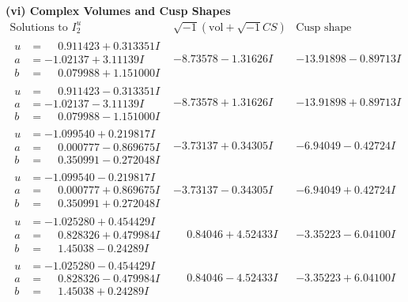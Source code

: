\documentclass[1p]{elsarticle_modified}
\theoremstyle{definition}
\newcommand{\I}{\sqrt{-1}}
\begin{document}
\newpage\flushleft \textbf{(vi) Complex Volumes and Cusp Shapes}
$$\begin{array}{c|c|c}  
\text{Solutions to }I^u_{2}& \I (\text{vol} + \sqrt{-1}CS) & \text{Cusp shape}\\
 \hline 
\begin{aligned}
u &= \phantom{-}0.911423 + 0.313351 I \\
a &= -1.02137 + 3.11139 I \\
b &= \phantom{-}0.079988 + 1.151000 I\end{aligned}
 & -8.73578 - 1.31626 I & -13.91898 - 0.89713 I \\ \hline\begin{aligned}
u &= \phantom{-}0.911423 - 0.313351 I \\
a &= -1.02137 - 3.11139 I \\
b &= \phantom{-}0.079988 - 1.151000 I\end{aligned}
 & -8.73578 + 1.31626 I & -13.91898 + 0.89713 I \\ \hline\begin{aligned}
u &= -1.099540 + 0.219817 I \\
a &= \phantom{-}0.000777 - 0.869675 I \\
b &= \phantom{-}0.350991 - 0.272048 I\end{aligned}
 & -3.73137 + 0.34305 I & -6.94049 - 0.42724 I \\ \hline\begin{aligned}
u &= -1.099540 - 0.219817 I \\
a &= \phantom{-}0.000777 + 0.869675 I \\
b &= \phantom{-}0.350991 + 0.272048 I\end{aligned}
 & -3.73137 - 0.34305 I & -6.94049 + 0.42724 I \\ \hline\begin{aligned}
u &= -1.025280 + 0.454429 I \\
a &= \phantom{-}0.828326 + 0.479984 I \\
b &= \phantom{-}1.45038 - 0.24289 I\end{aligned}
 & \phantom{-}0.84046 + 4.52433 I & -3.35223 - 6.04100 I \\ \hline\begin{aligned}
u &= -1.025280 - 0.454429 I \\
a &= \phantom{-}0.828326 - 0.479984 I \\
b &= \phantom{-}1.45038 + 0.24289 I\end{aligned}
 & \phantom{-}0.84046 - 4.52433 I & -3.35223 + 6.04100 I \\ \hline\begin{aligned}

\end{aligned}
\end{array}$$
\end{document}
